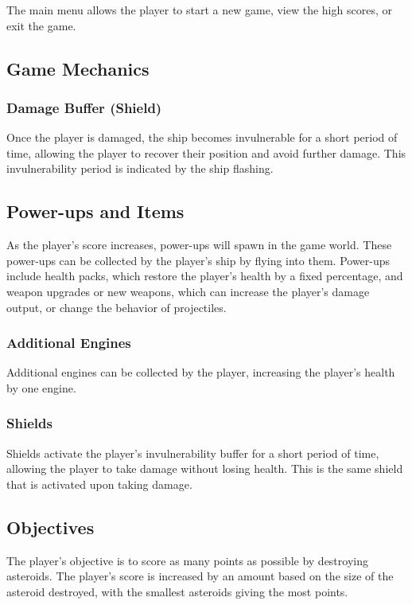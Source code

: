 \documentclass[12pt, a4paper]{article}
\begin{document}
The main menu allows the player to start a new game, view the high scores, or exit the game.

\subsection{Game Mechanics}

\subsubsection{Damage Buffer (Shield)}

Once the player is damaged, the ship becomes invulnerable for a short period of time, allowing the player to recover their position and avoid further damage. This invulnerability period is indicated by the ship flashing.

\subsection{Power-ups and Items}

As the player's score increases, power-ups will spawn in the game world. These power-ups can be collected by the player's ship by flying into them. Power-ups include health packs, which restore the player's health by a fixed percentage, and weapon upgrades or new weapons, which can increase the player's damage output, or change the behavior of projectiles.

\subsubsection{Additional Engines}

Additional engines can be collected by the player, increasing the player's health by one engine.

\subsubsection{Shields}

Shields activate the player's invulnerability buffer for a short period of time, allowing the player to take damage without losing health. This is the same shield that is activated upon taking damage.

\subsection{Objectives}

The player's objective is to score as many points as possible by destroying asteroids. The player's score is increased by an amount based on the size of the asteroid destroyed, with the smallest asteroids giving the most points.
\end{document}
